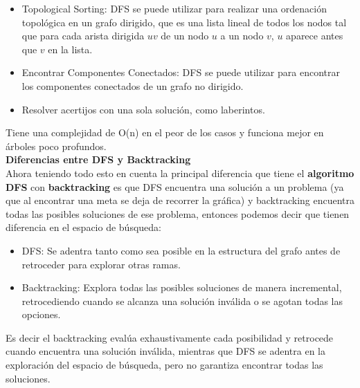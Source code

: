 \begin{itemize}
\begin{itemize}
        \item Topological Sorting: DFS se puede utilizar para realizar una ordenación topológica 
        en un grafo dirigido, que es una lista lineal de todos los nodos tal que para cada arista 
        dirigida $uv$ de un nodo $u$ a un nodo $v$, $u$ aparece antes que $v$ en la lista.

        \item Encontrar Componentes Conectados: DFS se puede utilizar para encontrar los componentes 
        conectados de un grafo no dirigido.

        \item Resolver acertijos con una sola solución, como laberintos.
    \end{itemize}

\end{itemize}


Tiene una complejidad de O(n) en el peor de los casos y funciona mejor en árboles poco profundos.\\

\textbf{\large{Diferencias entre DFS y Backtracking}} \\

Ahora teniendo todo esto en cuenta la principal diferencia que tiene el \textbf{algoritmo DFS} 
con \textbf{backtracking} es que DFS encuentra una solución a un problema (ya que al encontrar una 
meta se deja de recorrer la gráfica) y backtracking encuentra todas las posibles soluciones de ese 
problema, entonces podemos decir que tienen diferencia en el espacio de búsqueda:\\

\begin{itemize}
    \item DFS: Se adentra tanto como sea posible en la estructura del grafo antes de retroceder 
    para explorar otras ramas.

    \item Backtracking: Explora todas las posibles soluciones de manera incremental, retrocediendo 
    cuando se alcanza una solución inválida o se agotan todas las opciones.
\end{itemize}

Es decir el backtracking evalúa exhaustivamente cada posibilidad y retrocede cuando encuentra una solución inválida, mientras que DFS se adentra en la exploración del espacio de búsqueda, pero no garantiza encontrar todas las soluciones.

